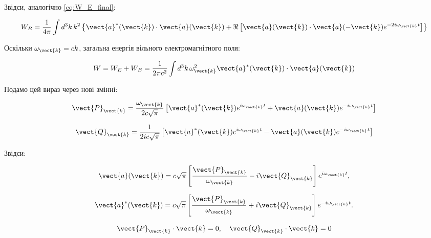 Звідси, аналогічно \eqref{eq:W_E_final}:

\begin{equation}
W_B = \frac{1}{4\pi} \int d^3k \, k^2 \left\{ \vect{a}^*(\vect{k}) \cdot \vect{a}(\vect{k}) + \Re \left[ \vect{a}(\vect{k}) \cdot
\vect{a}(-\vect{k}) e^{-2i\omega_{\vect{k}} t} \right] \right\}
\label{eq:W_B_final}
\end{equation}

Оскільки \(\omega_{\vect{k}} = ck\), загальна енергія вільного електромагнітного поля:

\begin{equation}
W = W_E + W_B = \frac{1}{2\pi c^2} \int d^3k \, \omega_{\vect{k}}^2 \vect{a}^*(\vect{k}) \cdot \vect{a}(\vect{k})
\label{eq:total_energy}
\end{equation}

Подамо цей вираз через нові змінні:

\begin{equation}
\vect{P}_{\vect{k}} = \frac{\omega_{\vect{k}}}{2c\sqrt{\pi}} \left[ \vect{a}^*(\vect{k}) e^{i\omega_{\vect{k}} t} + \vect{a}(\vect{k})
e^{-i\omega_{\vect{k}} t} \right]
\label{eq:P_k}
\end{equation}

\begin{equation}
\vect{Q}_{\vect{k}} = \frac{1}{2ic\sqrt{\pi}} \left[ \vect{a}^*(\vect{k}) e^{i\omega_{\vect{k}} t} - \vect{a}(\vect{k}) e^{-i\omega_{\vect{k}} t} \right]
\label{eq:Q_k}
\end{equation}

Звідси:

\begin{equation*}
\vect{a}(\vect{k}) = c\sqrt{\pi} \left[ \frac{\vect{P}_{\vect{k}}}{\omega_{\vect{k}}} - i\vect{Q}_{\vect{k}} \right] e^{i\omega_{\vect{k}} t},
\end{equation*}

\begin{equation*}
\vect{a}^*(\vect{k}) = c\sqrt{\pi} \left[ \frac{\vect{P}_{\vect{k}}}{\omega_{\vect{k}}} + i\vect{Q}_{\vect{k}} \right] e^{-i\omega_{\vect{k}} t}.
\end{equation*}

\begin{equation*}
\vect{P}_{\vect{k}} \cdot \vect{k} = 0, \quad \vect{Q}_{\vect{k}} \cdot \vect{k} = 0
\end{equation*}